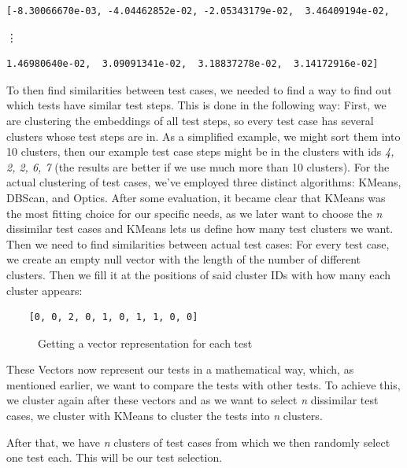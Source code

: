 \begin{Verbatim}
[-8.30066670e-03, -4.04462852e-02, -2.05343179e-02,  3.46409194e-02,
\end{Verbatim}
\vdots
\begin{Verbatim}
1.46980640e-02,  3.09091341e-02,  3.18837278e-02,  3.14172916e-02]
\end{Verbatim}

To then find similarities between test cases, we needed to find a way to find out which tests have similar test steps. This is done in the following way:
First, we are clustering the embeddings of all test steps, so every test case has several clusters whose test steps are in. As a simplified example, we might sort them into 10 clusters, then our example test case steps might be in the clusters with ids \emph{4, 2, 2, 6, 7} (the results are better if we use much more than 10 clusters).
For the actual clustering of test cases, we've employed three distinct algorithms: KMeans, DBScan, and Optics. After some evaluation, it became clear that KMeans was the most fitting choice for our specific needs, as we later want to choose the \emph{n} dissimilar test cases and KMeans lets us define how many test clusters we want.
Then we need to find similarities between actual test cases:
For every test case, we create an empty null vector with the length of the number of different clusters. Then we fill it at the positions of said cluster IDs with how many each cluster appears:

\begin{Verbatim}
    [0, 0, 2, 0, 1, 0, 1, 1, 0, 0]
\end{Verbatim}



\begin{figure}[H]
    
\noindent{}
\caption{Getting a vector representation for each test}

\end{figure}


These Vectors now represent our tests in a mathematical way, which, as mentioned earlier, we want to compare the tests with other tests.
To achieve this, we cluster again after these vectors and as we want to select \emph{n} dissimilar test cases, we cluster with KMeans to cluster the tests into \emph{n} clusters.

After that, we have \emph{n} clusters of test cases from which we then randomly select one test each. This will be our test selection.
